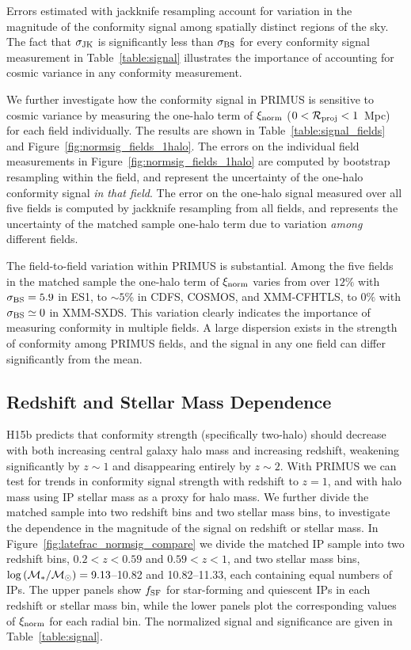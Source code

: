 

Errors estimated with jackknife resampling account for variation in the 
magnitude of the conformity signal among spatially distinct regions of the sky.
The fact that $\sigmaJK$ is significantly less than $\sigmaBS$ for every conformity signal measurement in Table~\ref{table:signal}
illustrates the importance of accounting for cosmic variance in any conformity measurement.

We further investigate how the conformity signal in PRIMUS is sensitive to cosmic variance by measuring the one-halo term of $\signorm$ {($0<\mathcal{R}_{\text{proj}}<1$~Mpc)} for each field individually.
The results are shown in Table~\ref{table:signal_fields} and Figure~\ref{fig:normsig_fields_1halo}.
The errors on the individual field measurements in Figure~\ref{fig:normsig_fields_1halo} are computed by bootstrap resampling within the field, and represent the uncertainty of the one-halo conformity signal \emph{in that field}.
The error on the one-halo signal measured over all five fields is computed by jackknife resampling from all fields, and represents the uncertainty of the matched sample one-halo term due to variation \emph{among} different fields.

The field-to-field variation within PRIMUS is substantial.
Among the five fields in the matched sample the one-halo term of 
$\signorm$ varies from over $12\%$ with $\sigmaBS=5.9$ in ES1, to $\sim5$\% in 
CDFS, COSMOS, and XMM-CFHTLS, to $0\%$ with $\sigmaBS\simeq0$ in XMM-SXDS.
This variation clearly indicates the importance of measuring conformity in multiple fields.  A large dispersion exists in the strength of conformity among PRIMUS fields, and the signal in any one field can differ significantly from the mean.


\subsection{Redshift and Stellar Mass Dependence}\label{sec:z_mass_bins}

H15b predicts that conformity strength (specifically two-halo) should decrease with both increasing central galaxy halo mass and increasing redshift, weakening significantly by $z\sim1$ and disappearing entirely by $z\sim2$.
With PRIMUS we can test for trends in conformity signal strength with redshift to $z=1$, and with halo mass using IP stellar mass as a proxy for halo mass.
We further divide the matched sample into two redshift bins and two stellar mass bins, 
to investigate the dependence in the magnitude of the signal on redshift or 
stellar mass.
In Figure~\ref{fig:latefrac_normsig_compare} we divide the matched IP sample into two redshift bins, ${0.2<z<0.59}$ and ${0.59<z<1}$, and two stellar mass bins, 
${\logM=9.13}$--10.82 and 10.82--11.33, each containing equal numbers of IPs.
The upper panels show $\flate$ for star-forming and quiescent IPs in each redshift or stellar mass bin, while the lower panels plot the corresponding values of
$\signorm$ for each radial bin. The normalized signal and significance are given in 
Table~\ref{table:signal}.

